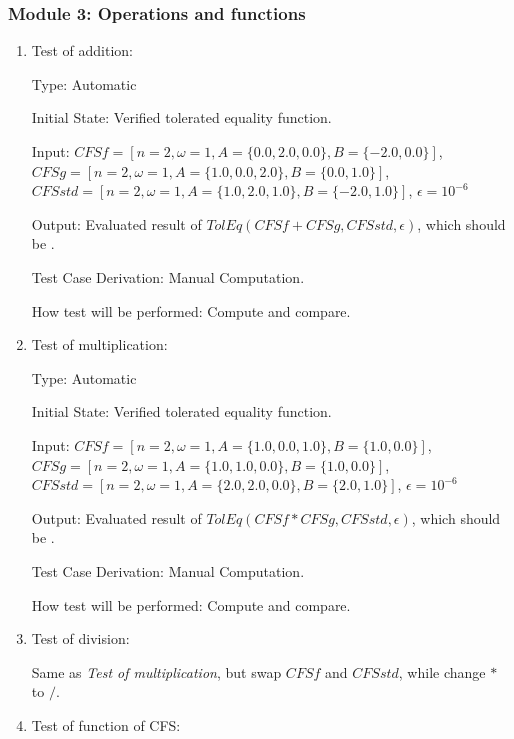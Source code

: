 \documentclass[12pt, titlepage]{article}
\begin{document}
\subsubsection{Module 3: Operations and functions}

\begin{enumerate}
	\item{Test of addition: \\}
	
	Type: Automatic
	
	Initial State: Verified tolerated equality function.
	
	Input: $\mathit{CFSf}=[n=2,\omega=1, A=\{0.0, 2.0, 0.0\}, B=\{-2.0,
        0.0\}]$,
        $\mathit{CFSg}=[n=2,\omega=1, A=\{1.0, 0.0, 2.0\}, B=\{0.0, 1.0\}]$,
        $\mathit{CFSstd}=[n=2,\omega=1, A=\{1.0, 2.0, 1.0\}, B=\{-2.0, 1.0\}]$,
        $\epsilon=10^{-6}$
	
	Output: Evaluated result of
        $\mathit{TolEq}(\mathit{CFSf}+\mathit{CFSg}, \mathit{CFSstd},
        \epsilon)$, which should be .
	
	Test Case Derivation: Manual Computation.
	
	How test will be performed: Compute and compare.
	
	\item{Test of multiplication:\\}
	
	Type: Automatic
	
	Initial State: Verified tolerated equality function.
	
	Input: $\mathit{CFSf}=[n=2, \omega=1, A=\{1.0, 0.0, 1.0\}, B=\{1.0, 0.0\}]$,
	$\mathit{CFSg}=[n=2, \omega=1, A=\{1.0, 1.0, 0.0\}, B=\{1.0, 0.0\}]$, 
	$\mathit{CFSstd}=[n=2, \omega=1, A=\{2.0, 2.0, 0.0\}, B=\{2.0, 1.0\}]$,
	$\epsilon=10^{-6}$
	
	Output: Evaluated result of
        $\mathit{TolEq}(\mathit{CFSf}*\mathit{CFSg}, \mathit{CFSstd},
        \epsilon)$, which should be .
	
	Test Case Derivation: Manual Computation.
	
	How test will be performed: Compute and compare.
	
	\item{Test of division: \\}
	
          Same as \textit{Test of multiplication}, but swap $\mathit{CFSf}$ and
          $\mathit{CFSstd}$, while change $*$ to $/$.
	
	\item{Test of function of CFS: \\}
	

\end{enumerate}
\end{document}
